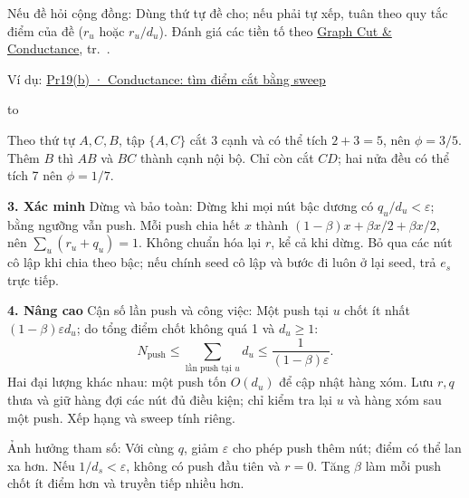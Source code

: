 \documentclass[10pt,a4paper,twocolumn]{article}
\newcommand{\key}[1]{#1:\enspace}
\newcommand{\blocklabel}[1]{\par\noindent#1\par\nobreak}
\newcommand{\qlink}[2]{\hyperref[question:#1]{#2}}
\newenvironment{example}[2]{%
  \par\addvspace{6pt}\noindent
  \raggedright
  \blocklabel{Ví dụ: \qlink{#1}{#2}}%
}{\par\addvspace{4pt}}
\newenvironment{diagram}{%
  \par\addvspace{3pt}\noindent\hbox to \linewidth\bgroup\hfil
}{\hfil\egroup\par\addvspace{3pt}}
\newcommand{\unitheading}[2]{%
  \par\addvspace{1pt}\noindent\textbf{#1. #2}\enspace}
\newcommand{\unitverification}{\unitheading{3}{Xác minh}}
\newcommand{\unitadvanced}{\unitheading{4}{Nâng cao}}
\begin{document}
\key{Nếu đề hỏi cộng đồng} Dùng thứ tự đề cho; nếu phải tự xếp, tuân theo quy tắc điểm của đề ($r_u$ hoặc $r_u/d_u$). Đánh giá các tiền tố theo \hyperref[topic:conductance]{Graph Cut \& Conductance}, tr.~\pageref*{topic:conductance}.

\begin{example}{Pr19}{Pr19(b) · Conductance: tìm điểm cắt bằng sweep}
\begin{diagram}
\end{diagram}
Theo thứ tự $A,C,B$, tập $\{A,C\}$ cắt 3 cạnh và có thể tích $2+3=5$, nên $\phi=3/5$. Thêm $B$ thì $AB$ và $BC$ thành cạnh nội bộ. Chỉ còn cắt $CD$; hai nửa đều có thể tích 7 nên $\phi=1/7$.
\end{example}


\unitverification
\key{Dừng và bảo toàn} Dừng khi mọi nút bậc dương có $q_u/d_u<\varepsilon$; bằng ngưỡng vẫn push. Mỗi push chia hết $x$ thành $(1-\beta)x+\beta x/2+\beta x/2$, nên $\sum_u(r_u+q_u)=1$. Không chuẩn hóa lại $r$, kể cả khi dừng. Bỏ qua các nút cô lập khi chia theo bậc; nếu chính seed cô lập và bước đi luôn ở lại seed, trả $e_s$ trực tiếp.

\unitadvanced
\key{Cận số lần push và công việc} Một push tại $u$ chốt ít nhất $(1-\beta)\varepsilon d_u$; do tổng điểm chốt không quá 1 và $d_u\ge1$:
\[
N_{\mathrm{push}}\le\sum_{\text{lần push tại }u}d_u
\le\frac{1}{(1-\beta)\varepsilon}.
\]
Hai đại lượng khác nhau: một push tốn $O(d_u)$ để cập nhật hàng xóm. Lưu $r,q$ thưa và giữ hàng đợi các nút đủ điều kiện; chỉ kiểm tra lại $u$ và hàng xóm sau một push. Xếp hạng và sweep tính riêng.

\key{Ảnh hưởng tham số} Với cùng $q$, giảm $\varepsilon$ cho phép push thêm nút; điểm có thể lan xa hơn. Nếu $1/d_s<\varepsilon$, không có push đầu tiên và $r=0$. Tăng $\beta$ làm mỗi push chốt ít điểm hơn và truyền tiếp nhiều hơn.
\end{document}

